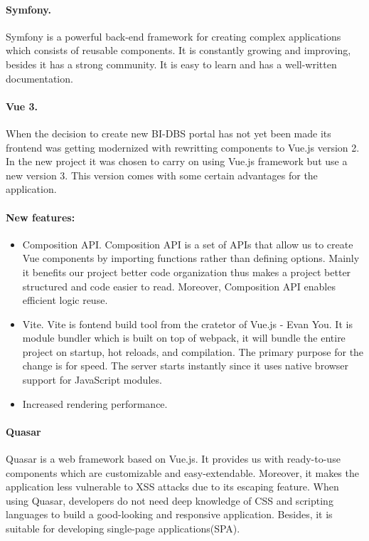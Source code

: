 \paragraph*{Symfony.} Symfony is a powerful back-end framework for creating complex applications which consists of reusable components. It is constantly growing and improving, besides it has a strong community. It is easy to learn and has a well-written documentation.


\paragraph*{Vue 3.} When the decision to create new BI-DBS portal has not yet been made its frontend was getting modernized with rewritting components to Vue.js version 2. In the new project it was chosen to carry on using Vue.js framework but use a new version 3. This version comes with some certain advantages for the application.

\paragraph*{New features:}
\begin{itemize}
  \item Composition API. Composition API is a set of APIs that allow us to create Vue components by importing functions rather than defining options. Mainly it benefits our project better code organization thus makes a project better structured and code easier to read. Moreover, Composition API enables efficient logic reuse.
  
   \item Vite. Vite is fontend build tool from the cratetor of Vue.js - Evan You. It is module bundler which is built on top of webpack, it will bundle the entire project on startup, hot reloads, and compilation. The primary purpose for the change is for speed. The server starts instantly since it uses native browser support for JavaScript modules.

   \item Increased rendering performance.

\end{itemize}

\paragraph*{Quasar} Quasar is a web framework based on Vue.js. It provides us with ready-to-use components which are customizable and easy-extendable. Moreover, it makes the application less vulnerable to XSS attacks due to its escaping feature. When using Quasar, developers do not need deep knowledge of CSS and scripting languages to build a good-looking  and responsive application. Besides, it is suitable for developing single-page applications(SPA).


